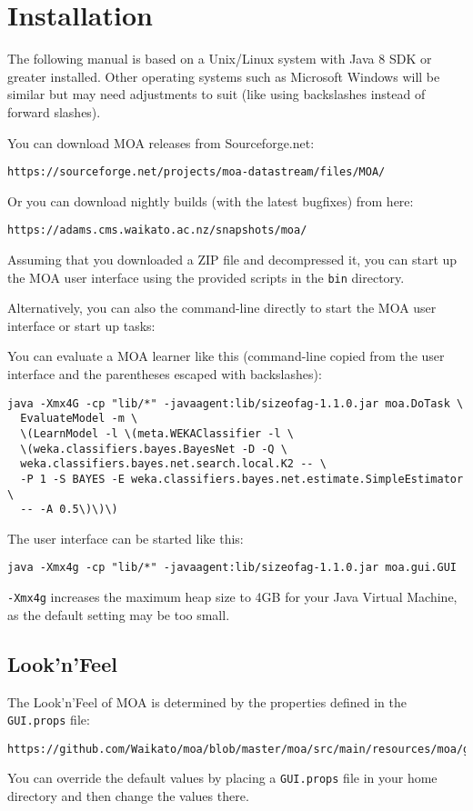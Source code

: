 \documentclass[a4paper,12pt,twoside]{book}
\begin{document}
\chapter{Installation}

The following manual is based on a Unix/Linux system with Java 8 SDK or greater installed.
Other operating systems such as Microsoft Windows will be similar but may need adjustments
to suit (like using backslashes instead of forward slashes).

\noindent You can download MOA releases from Sourceforge.net:
\begin{verbatim}
https://sourceforge.net/projects/moa-datastream/files/MOA/
\end{verbatim}

\noindent Or you can download nightly builds (with the latest bugfixes) from here:
\begin{verbatim}
https://adams.cms.waikato.ac.nz/snapshots/moa/
\end{verbatim}

Assuming that you downloaded a ZIP file and decompressed it, you can start up
the MOA user interface using the provided scripts in the \verb|bin| directory.

Alternatively, you can also the command-line directly to start the MOA user
interface or start up tasks:

You can evaluate a MOA learner like this (command-line copied from the user
interface and the parentheses escaped with backslashes):
{\scriptsize
\begin{verbatim}
java -Xmx4G -cp "lib/*" -javaagent:lib/sizeofag-1.1.0.jar moa.DoTask \
  EvaluateModel -m \
  \(LearnModel -l \(meta.WEKAClassifier -l \
  \(weka.classifiers.bayes.BayesNet -D -Q \
  weka.classifiers.bayes.net.search.local.K2 -- \
  -P 1 -S BAYES -E weka.classifiers.bayes.net.estimate.SimpleEstimator \
  -- -A 0.5\)\)\)
\end{verbatim}}
\noindent The user interface can be started like this:
{\scriptsize
\begin{verbatim}
java -Xmx4g -cp "lib/*" -javaagent:lib/sizeofag-1.1.0.jar moa.gui.GUI
\end{verbatim}}

\texttt{-Xmx4g} increases the maximum heap size to 4GB for your Java Virtual Machine, as
the default setting may be too small.

\section{Look'n'Feel}
The Look'n'Feel of MOA is determined by the properties defined in the \verb|GUI.props|
file:
{\scriptsize
\begin{verbatim}
https://github.com/Waikato/moa/blob/master/moa/src/main/resources/moa/gui/GUI.props
\end{verbatim}}
You can override the default values by placing a \verb|GUI.props| file in your
home directory and then change the values there.
\end{document}
